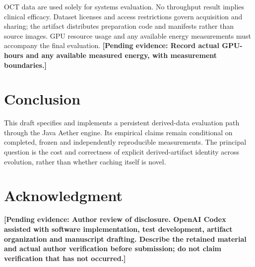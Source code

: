 \documentclass[journal]{IEEEtran}
\newcommand{\pending}[1]{\textbf{[Pending evidence: #1]}}
\begin{document}
OCT data are used solely for systems evaluation. No throughput result implies clinical efficacy. Dataset licenses and access restrictions govern acquisition and sharing; the artifact distributes preparation code and manifests rather than source images. GPU resource usage and any available energy measurements must accompany the final evaluation. \pending{Record actual GPU-hours and any available measured energy, with measurement boundaries.}

\section{Conclusion}
This draft specifies and implements a persistent derived-data evaluation path through the Java Aether engine. Its empirical claims remain conditional on completed, frozen and independently reproducible measurements. The principal question is the cost and correctness of explicit derived-artifact identity across evolution, rather than whether caching itself is novel.

\section*{Acknowledgment}
\pending{Author review of disclosure. OpenAI Codex assisted with software implementation, test development, artifact organization and manuscript drafting. Describe the retained material and actual author verification before submission; do not claim verification that has not occurred.}


\end{document}
